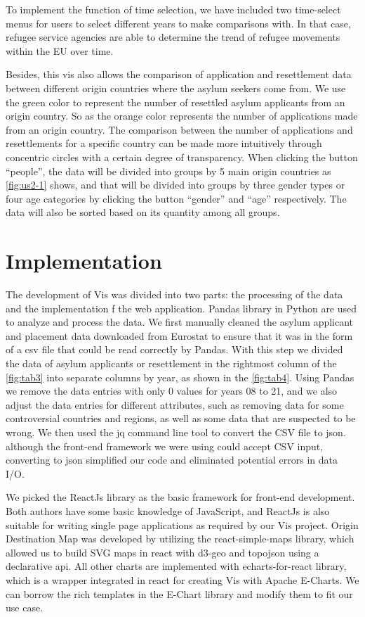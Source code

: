 \documentclass[journal]{vgtc}                %
\begin{document}
To implement the function of time selection, we have included two time-select menus for users to select different years to make comparisons with. In that case, refugee service agencies are able to determine the trend of refugee movements within the EU over time. 

Besides, this vis also allows the comparison of application and resettlement data between different origin countries where the asylum seekers come from. We use the green color to represent the number of resettled asylum applicants from an origin country. So as the orange color represents the number of applications made from an origin country. The comparison between the number of applications and resettlements for a specific country can be made more intuitively through concentric circles with a certain degree of transparency. When clicking the button “people”, the data will be divided into groups by 5 main origin countries as \autoref{fig:us2-1} shows, and that will be divided into groups by three gender types or four age categories by clicking the button “gender” and “age” respectively. The data will also be sorted based on its quantity among all groups. 


\section{Implementation}
The development of Vis was divided into two parts: the processing of the data and the implementation f the web application. Pandas library in Python are used to analyze and process the data. We first manually cleaned the asylum applicant and placement data downloaded from Eurostat to ensure that it was in the form of a csv file that could be read correctly by Pandas. With this step we divided the data of asylum applicants or resettlement in the rightmost column of the \autoref{fig:tab3} into separate columns by year, as shown in the \autoref{fig:tab4}. Using Pandas we remove the data entries with only 0 values for years 08 to 21, and we also adjust the data entries for different attributes, such as removing data for some controversial countries and regions, as well as some data that are suspected to be wrong. We then used the jq command line tool to convert the CSV file to json. although the front-end framework we were using could accept CSV input, converting to json simplified our code and eliminated potential errors in data I/O.

We picked the ReactJs library as the basic framework for front-end development. Both authors have some basic knowledge of JavaScript, and ReactJs is also suitable for writing single page applications as required by our Vis project. Origin Destination Map was developed by  utilizing the react-simple-maps library, which allowed us to build SVG maps in react with d3-geo and topojson using a declarative api. All other charts are implemented with echarts-for-react library, which is a wrapper integrated in react for creating Vis with Apache E-Charts. We can borrow the rich templates in the E-Chart library and modify them to fit our use case.
\end{document}
